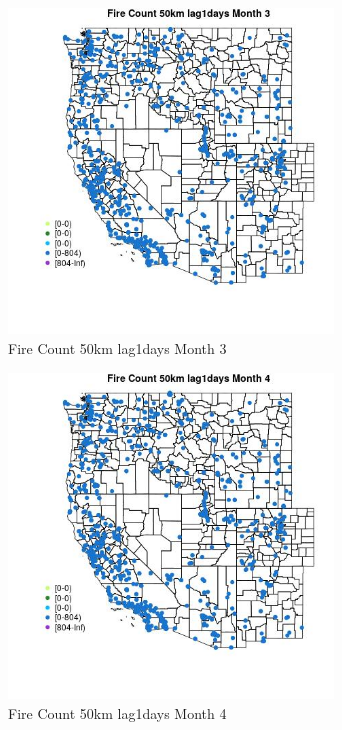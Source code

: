 \begin{figure} 
\centering  
\includegraphics[width=0.77\textwidth]{Code_Outputs/Report_ML_input_PM25_Step4_part_f_de_duplicated_aveswNAs_MapObsMo3Fire_Count_50km_lag1days.jpg} 
\caption{\label{fig:Report_ML_input_PM25_Step4_part_f_de_duplicated_aveswNAsMapObsMo3Fire_Count_50km_lag1days}Fire Count 50km lag1days Month 3} 
\end{figure} 
 

\begin{figure} 
\centering  
\includegraphics[width=0.77\textwidth]{Code_Outputs/Report_ML_input_PM25_Step4_part_f_de_duplicated_aveswNAs_MapObsMo4Fire_Count_50km_lag1days.jpg} 
\caption{\label{fig:Report_ML_input_PM25_Step4_part_f_de_duplicated_aveswNAsMapObsMo4Fire_Count_50km_lag1days}Fire Count 50km lag1days Month 4} 
\end{figure} 
 

